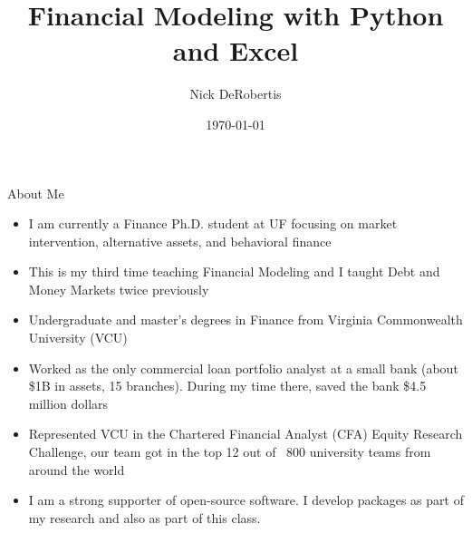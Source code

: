 \documentclass[]{article}
\begin{document}
\title{Financial Modeling with Python and Excel}
\author{Nick DeRobertis}
\date{\today}
\maketitle
\begin{section}{About Me}
\begin{itemize}
\item I am currently a Finance Ph.D. student at UF focusing on market intervention, alternative assets, and behavioral finance
\item This is my third time teaching Financial Modeling and I taught Debt and Money Markets twice previously
\item Undergraduate and master's degrees in Finance from Virginia Commonwealth University (VCU)
\item Worked as the only commercial loan portfolio analyst at a small bank (about \$1B in assets, 15 branches). During my time there, saved the bank \$4.5 million dollars
\item Represented VCU in the Chartered Financial Analyst (CFA) Equity Research Challenge, our team got in the top 12 out of ~800 university teams from around the world
\item I am a strong supporter of open-source software. I develop packages as part of my research and also as part of this class.
\end{itemize}
\end{section}
\end{document}
